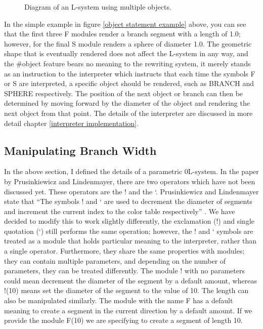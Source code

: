 \begin{figure}[htbp]
	{\centering
		\vspace{7px}
		\setlength{\fboxrule}{1pt}
		\caption{Diagram of an L-system using multiple objects.}
	}
\end{figure}
\FloatBarrier

\noindent
In the simple example in figure \ref{object statement example} above, you can see that the first three F modules render a branch segment with a length of 1.0; however, for the final S module renders a sphere of diameter 1.0. The geometric shape that is eventually rendered does not affect the L-system in any way, and the \#object feature bears no meaning to the rewriting system, it merely stands as an instruction to the interpreter which instructs that each time the symbols F or S are interpreted, a specific object should be rendered, such as BRANCH and SPHERE respectively. The position of the next object or branch can then be determined by moving forward by the diameter of the object and rendering the next object from that point. The details of the interpreter are discussed in more detail chapter \ref{interpreter implementation}.

\subsection{Manipulating Branch Width}

In the above section, I defined the details of a parametric 0L-system. In the paper by Prusinkiewicz and Lindenmayer, there are two operators which have not been discussed yet. These operators are the ! and the ‘. Prusinkiewicz and Lindenmayer state that “The symbols ! and ‘ are used to decrement the diameter of segments and increment the current index to the color table respectively” \cite{prusinkiewicz2012algorithmic}. We have decided to modify this to work slightly differently, the exclamation (!) and single quotation (‘) still performs the same operation; however, the ! and ‘ symbols are treated as a module that holds particular meaning to the interpreter, rather than a single operator. Furthermore, they share the same properties with modules; they can contain multiple parameters, and depending on the number of parameters, they can be treated differently. The module ! with no parameters could mean decrement the diameter of the segment by a default amount, whereas !(10) means set the diameter of the segment to the value of 10. The length can also be manipulated similarly. The module with the name F has a default meaning to create a segment in the current direction by a default amount. If we provide the module F(10) we are specifying to create a segment of length 10.

